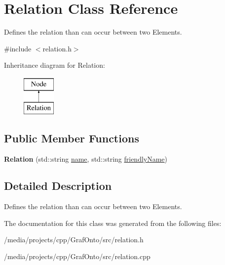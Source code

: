 \hypertarget{class_relation}{\section{\-Relation \-Class \-Reference}
\label{class_relation}
}


\-Defines the relation than can occur between two \-Elements.  




{\ttfamily \#include $<$relation.\-h$>$}

\-Inheritance diagram for \-Relation\-:\begin{figure}[H]
\begin{center}
\leavevmode
\includegraphics[height=2.000000cm]{class_relation}
\end{center}
\end{figure}
\subsection*{\-Public \-Member \-Functions}
\begin{DoxyCompactItemize}
\item 
\hypertarget{class_relation_a3ff4bd679e3645c3694abdca2fd33cea}{{\bfseries \-Relation} (std\-::string \hyperlink{class_node_aa829edc37a2c92dacdab95bcef248175}{name}, std\-::string \hyperlink{class_node_a157acddebd6860eccdc8495039db161f}{friendly\-Name})}\label{class_relation_a3ff4bd679e3645c3694abdca2fd33cea}

\end{DoxyCompactItemize}


\subsection{\-Detailed \-Description}
\-Defines the relation than can occur between two \-Elements. 

\-The documentation for this class was generated from the following files\-:\begin{DoxyCompactItemize}
\item 
/media/projects/cpp/\-Graf\-Onto/src/relation.\-h\item 
/media/projects/cpp/\-Graf\-Onto/src/relation.\-cpp\end{DoxyCompactItemize}
